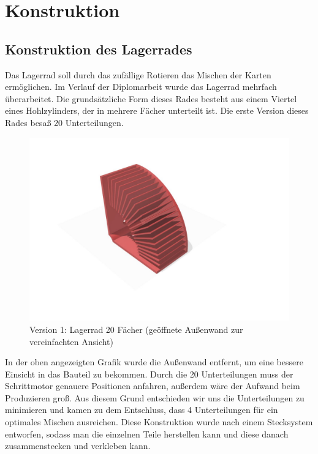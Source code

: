\pagebreak
\section{Konstruktion}
\subsection{Konstruktion des Lagerrades}
Das Lagerrad soll durch das zufällige Rotieren das Mischen der Karten ermöglichen. Im Verlauf der Diplomarbeit wurde das Lagerrad mehrfach überarbeitet.
Die grundsätzliche Form dieses Rades besteht aus einem Viertel eines Hohlzylinders, der in mehrere Fächer unterteilt ist. Die erste Version dieses Rades besaß 20 Unterteilungen.

\begin{figure}[H]
    \centering
    \includegraphics[scale=0.5,page=1]{fig/mech/LagerRad20F}
    \caption{Version 1: Lagerrad 20 Fächer (geöffnete Außenwand zur vereinfachten Ansicht)}
\end{figure}

In der oben angezeigten Grafik wurde die Außenwand entfernt, um eine bessere Einsicht in das Bauteil zu bekommen.
Durch die 20 Unterteilungen muss der Schrittmotor genauere Positionen anfahren, außerdem wäre der Aufwand beim Produzieren groß. Aus diesem Grund
entschieden wir uns die Unterteilungen zu minimieren und kamen zu dem Entschluss, dass 4 Unterteilungen für ein optimales Mischen ausreichen. Diese Konstruktion
wurde nach einem Stecksystem entworfen, sodass man die einzelnen Teile herstellen kann und diese danach zusammenstecken und verkleben kann.

